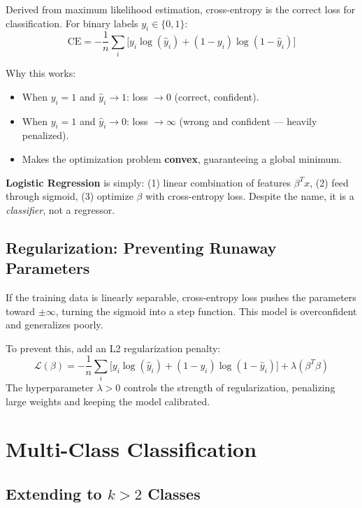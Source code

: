 \documentclass[12pt]{article}
\begin{document}
Derived from maximum likelihood estimation, cross-entropy is the correct loss for classification. For binary labels $y_i \in \{0,1\}$:
\[
\boxed{\text{CE} = -\frac{1}{n}\sum_i\bigl[y_i\log(\hat{y}_i) + (1-y_i)\log(1-\hat{y}_i)\bigr]}
\]

Why this works:
\begin{itemize}
  \item When $y_i = 1$ and $\hat{y}_i \to 1$: loss $\to 0$ (correct, confident).
  \item When $y_i = 1$ and $\hat{y}_i \to 0$: loss $\to \infty$ (wrong and confident --- heavily penalized).
  \item Makes the optimization problem \textbf{convex}, guaranteeing a global minimum.
\end{itemize}

\begin{takeawaybox}
\textbf{Logistic Regression} is simply: (1) linear combination of features $\beta^T x$, (2) feed through sigmoid, (3) optimize $\beta$ with cross-entropy loss. Despite the name, it is a \emph{classifier}, not a regressor.
\end{takeawaybox}

\subsection{Regularization: Preventing Runaway Parameters}

If the training data is linearly separable, cross-entropy loss pushes the parameters toward $\pm\infty$, turning the sigmoid into a step function. This model is overconfident and generalizes poorly.

To prevent this, add an L2 regularization penalty:
\[
\mathcal{L}(\beta) = -\frac{1}{n}\sum_i\bigl[y_i\log(\hat{y}_i) + (1-y_i)\log(1-\hat{y}_i)\bigr] + \lambda(\beta^T\beta)
\]
The hyperparameter $\lambda > 0$ controls the strength of regularization, penalizing large weights and keeping the model calibrated.

\section{Multi-Class Classification}

\subsection{Extending to $k > 2$ Classes}
\end{document}
